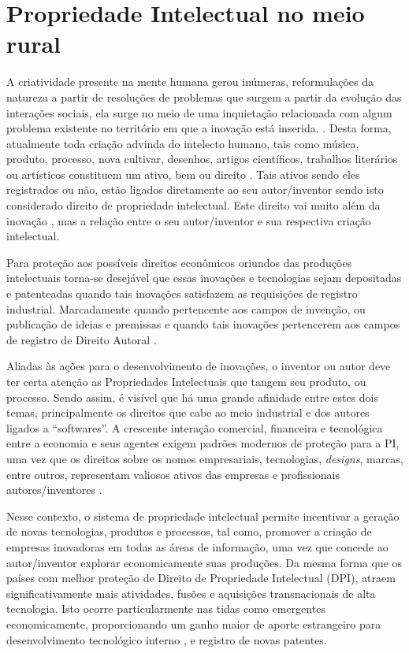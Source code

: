 \section{Propriedade Intelectual no meio rural}

A criatividade presente na mente humana gerou inúmeras, reformulações da natureza a partir de resoluções de problemas que surgem a partir da evolução das interações sociais, ela surge no meio de uma inquietação relacionada com algum problema existente no território em que a inovação está inserida. \cite{pacheco_dos_2018}. Desta forma, atualmente toda criação advinda do intelecto humano, tais como música, produto, processo, nova cultivar, desenhos, artigos científicos, trabalhos literários ou artísticos constituem um ativo, bem ou direito \cite{costa_interseccao_2011}. Tais ativos sendo eles registrados ou não, estão ligados diretamente ao seu autor/inventor sendo isto considerado direito de propriedade intelectual. Este direito vai muito além da inovação \cite{wipo_tratado_1970}, mas a relação entre o seu autor/inventor e sua respectiva criação intelectual.

Para proteção aos possíveis direitos econômicos oriundos das produções intelectuais torna-se desejável que essas inovações e tecnologias sejam depositadas e patenteadas quando tais inovações satisfazem as requisições de registro industrial. Marcadamente quando pertencente aos campos de invenção, ou publicação de ideias e premissas e quando tais inovações pertencerem aos campos de registro de Direito Autoral \cite{wipo_b06_2019}. 

Aliadas às ações para o desenvolvimento de inovações, o inventor ou autor deve ter certa atenção as Propriedades Intelectuais que tangem seu produto, ou processo. Sendo assim, é visível que há uma grande afinidade entre estes dois temas, principalmente os direitos que cabe ao meio industrial e dos autores ligados a “softwares”. A crescente interação comercial, financeira e tecnológica entre a economia e seus agentes exigem padrões modernos de proteção para a PI, uma vez que os direitos sobre os nomes empresariais, tecnologias, \textit{designs}, marcas, entre outros, representam valiosos ativos das empresas e profissionais autores/inventores \cite{sherwood_propriedade_1992}. 

Nesse contexto, o sistema de propriedade intelectual permite incentivar a geração de novas tecnologias, produtos e processos, tal como, promover a criação de empresas inovadoras em todas as áreas de informação, uma vez que concede ao autor/inventor explorar economicamente suas produções. Da mesma forma que os países com melhor proteção de Direito de Propriedade Intelectual (DPI), atraem significativamente mais atividades, fusões e aquisições transnacionais de alta tecnologia. Isto ocorre particularmente nas tidas como emergentes economicamente, proporcionando um ganho maior de aporte estrangeiro para desenvolvimento tecnológico interno \cite{hasan_impacts_2017}, e registro de novas patentes.

